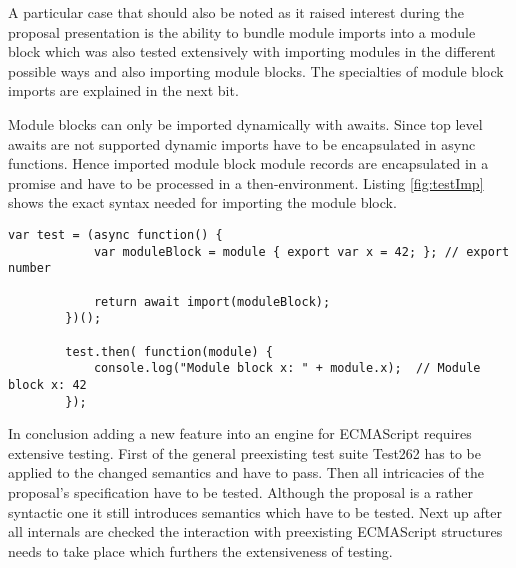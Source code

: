 A particular case that should also be noted as it raised interest during the proposal presentation is the ability to bundle module imports into a module block which was also tested extensively with importing modules in the different possible ways and also importing module blocks. The specialties of module block imports are explained in the next bit.

Module blocks can only be imported dynamically with awaits. Since top level awaits are not supported dynamic imports have to be encapsulated in async functions. Hence imported module block module records are encapsulated in a promise and have to be processed in a then-environment. Listing \ref{fig:testImp} shows the exact syntax needed for importing the module block.

    \begin{lstlisting}[caption={Module block dynamic import test}, label={fig:testImp}]
        var test = (async function() {
            var moduleBlock = module { export var x = 42; }; // export number
            
            return await import(moduleBlock);
        })();
        
        test.then( function(module) {
            console.log("Module block x: " + module.x);  // Module block x: 42
        });
    \end{lstlisting}

In conclusion adding a new feature into an engine for ECMAScript requires extensive testing. First of the general preexisting test suite Test262 has to be applied to the changed semantics and have to pass. Then all intricacies of the proposal's specification have to be tested. Although the proposal is a rather syntactic one it still introduces semantics which have to be tested. Next up after all internals are checked the interaction with preexisting ECMAScript structures needs to take place which furthers the extensiveness of testing.